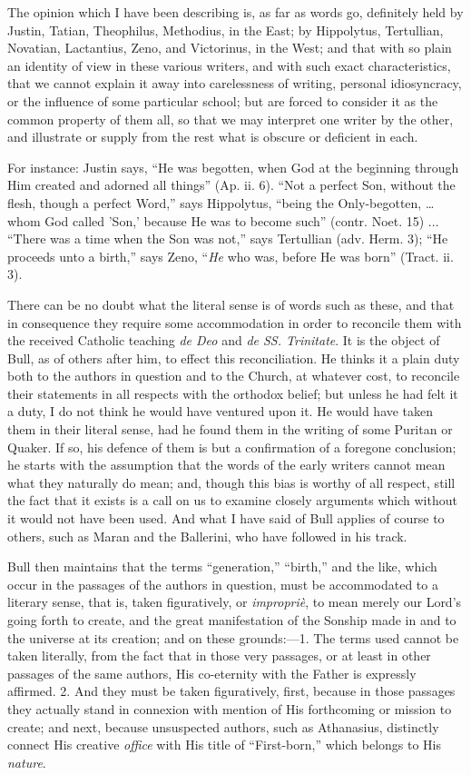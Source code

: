 The opinion which I have been describing is, as far as words go,
definitely held by Justin, Tatian, Theophilus, Methodius, in the East;
by Hippolytus, Tertullian, Novatian, Lactantius, Zeno, and Victorinus,
in the West; and that with so plain an identity of view in these
various writers, and with such exact characteristics, that we cannot
explain it away into carelessness of writing, personal idiosyncracy,
or the influence of some particular school; but are forced to consider
it as the common property of them all, so that we may interpret one
writer by the other, and illustrate or supply from the rest what is
obscure or deficient in each.

For instance: Justin says, ``He was begotten, when God at the
beginning through Him created and adorned all things'' (Ap. ii.
6). ``Not a perfect Son, without the flesh, though a perfect
Word,'' says Hippolytus, ``being the Only-begotten, … whom
God called 'Son,' because He was to become such'' (contr. Noet.
15) ... ``There was a time when the Son was not,'' says
Tertullian (adv. Herm. 3); ``He proceeds unto a birth,'' says
Zeno, ``\emph{He} who was, before He was born'' (Tract. ii.
3).

There can be no doubt what the literal sense is of words such as
these, and that in consequence they require some accommodation in
order to reconcile them with the received Catholic teaching \emph{de Deo}
and \emph{de SS. Trinitate}. It is the object of Bull, as of others
after him, to effect this reconciliation. He thinks it a plain duty
both to the authors in question and to the Church, at whatever cost,
to reconcile their statements in all respects with the orthodox
belief; but unless he had felt it a duty, I do not think he would
have ventured upon it. He would have taken them in their literal
sense, had he found them in the writing of some Puritan or Quaker. If
so, his defence of them is but a confirmation of a foregone
conclusion; he starts with the assumption that the words of the early
writers cannot mean what they naturally do mean; and, though this bias
is worthy of all respect, still the fact that it exists is a call on
us to examine closely arguments which without it would not have been
used. And what I have said of Bull applies of course to others, such
as Maran and the Ballerini, who have followed in his track.

Bull then maintains that the terms ``generation,''
``birth,'' and the like, which occur in the passages of the
authors in question, must be accommodated to a literary sense, that
is, taken figuratively, or \emph{impropriè}, to mean merely our Lord's
going forth to create, and the great manifestation of the Sonship made
in and to the universe at its creation; and on these grounds:—1. The
terms used cannot be taken literally, from the fact that in those very
passages, or at least in other passages of the same authors, His
co-eternity with the Father is expressly affirmed. 2. And they must be
taken figuratively, first, because in those passages they actually
stand in connexion with mention of His forthcoming or mission to
create; and next, because unsuspected authors, such as Athanasius,
distinctly connect His creative \emph{office} with His title of
``First-born,'' which belongs to His \emph{nature}.

